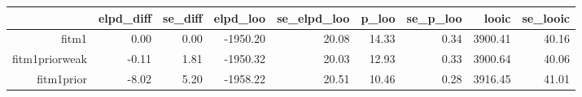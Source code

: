\begin{table}[ht]
\centering
\begin{tabular}{rrrrrrrrr}
  \hline
 & elpd\_diff & se\_diff & elpd\_loo & se\_elpd\_loo & p\_loo & se\_p\_loo & looic & se\_looic \\ 
  \hline
fitm1 & 0.00 & 0.00 & -1950.20 & 20.08 & 14.33 & 0.34 & 3900.41 & 40.16 \\ 
  fitm1priorweak & -0.11 & 1.81 & -1950.32 & 20.03 & 12.93 & 0.33 & 3900.64 & 40.06 \\ 
  fitm1prior & -8.02 & 5.20 & -1958.22 & 20.51 & 10.46 & 0.28 & 3916.45 & 41.01 \\ 
   \hline
\end{tabular}
\end{table}
